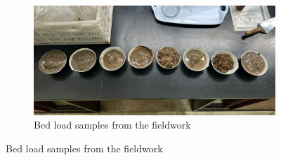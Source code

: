 \begin{figure}[H]
    \centering

    \begin{subfigure}{0.7\textwidth}
        \centering
        \includegraphics[width=\linewidth]{figures/appendixE/soilsamples.jpg}
        \caption{Bed load samples from the fieldwork}
    \end{subfigure}

    \par\vspace{0.5cm} %


\end{figure}
